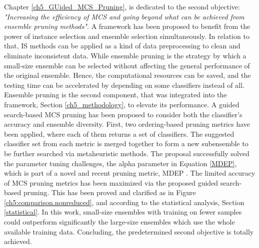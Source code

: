 Chapter \ref{ch5_GUided_MCS_Pruning}, is dedicated to the second objective: \textit{"Increasing the efficiency of MCS and going beyond what can
be achieved from ensemble pruning methods"}. A framework has been proposed to benefit from the power of instance selection and ensemble selection simultaneously. In relation to that, IS methods can be applied as a kind of data preprocessing to clean and eliminate inconsistent data. While ensemble pruning is the strategy by which a small-size ensemble can be selected without affecting the general performance of the original ensemble. Hence, the computational resources can be saved, and the testing time can be accelerated by depending on some classifiers instead of all. Ensemble pruning is the second component, that was integrated into the framework, Section \ref{ch5_methodology}, to elevate its performance. A guided search-based MCS pruning has been proposed to consider both the classifier’s accuracy and ensemble diversity. First, two ordering-based pruning metrics have been applied, where each of them returns a set of classifiers. The suggested classifier set from each metric is merged together to form a new subensemble to be further searched via metaheuristic methods. The proposal successfully solved the parameter tuning challenges, the alpha parameter in Equation \ref{MDEP}, which is part of a novel and recent pruning metric, MDEP \cite{guo2018}. The limited accuracy of MCS pruning metrics has been maximized via the proposed guided search-based pruning. This has been proved and clarified as in Figure \ref{ch5:comparison.nonreduced}, and according to the statistical analysis, Section \ref{statistical}. In this work, small-size ensembles with training on fewer samples could outperform significantly the large-size ensembles which use the whole available training data. Concluding, the predetermined second objective is totally achieved. 


